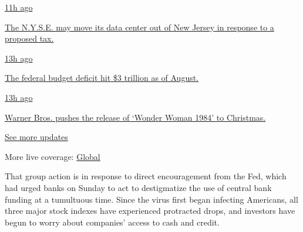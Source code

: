 \href{https://www.nytimes3xbfgragh.onion/live/2020/09/11/business/stock-market-today-coronavirus?action=click\&pgtype=Article\&state=default\&region=MAIN_CONTENT_1\&context=storylines_live_updates\#the-nyse-may-move-its-data-center-out-of-new-jersey-in-response-to-a-proposed-tax}{11h
ago}

\href{https://www.nytimes3xbfgragh.onion/live/2020/09/11/business/stock-market-today-coronavirus?action=click\&pgtype=Article\&state=default\&region=MAIN_CONTENT_1\&context=storylines_live_updates\#the-nyse-may-move-its-data-center-out-of-new-jersey-in-response-to-a-proposed-tax}{The
N.Y.S.E. may move its data center out of New Jersey in response to a
proposed tax.}

\href{https://www.nytimes3xbfgragh.onion/live/2020/09/11/business/stock-market-today-coronavirus?action=click\&pgtype=Article\&state=default\&region=MAIN_CONTENT_1\&context=storylines_live_updates\#the-federal-budget-deficit-hit-3-trillion-as-of-august}{13h
ago}

\href{https://www.nytimes3xbfgragh.onion/live/2020/09/11/business/stock-market-today-coronavirus?action=click\&pgtype=Article\&state=default\&region=MAIN_CONTENT_1\&context=storylines_live_updates\#the-federal-budget-deficit-hit-3-trillion-as-of-august}{The
federal budget deficit hit \$3 trillion as of August.}

\href{https://www.nytimes3xbfgragh.onion/live/2020/09/11/business/stock-market-today-coronavirus?action=click\&pgtype=Article\&state=default\&region=MAIN_CONTENT_1\&context=storylines_live_updates\#warner-bros-pushes-the-release-of-wonder-woman-1984-to-christmas}{13h
ago}

\href{https://www.nytimes3xbfgragh.onion/live/2020/09/11/business/stock-market-today-coronavirus?action=click\&pgtype=Article\&state=default\&region=MAIN_CONTENT_1\&context=storylines_live_updates\#warner-bros-pushes-the-release-of-wonder-woman-1984-to-christmas}{Warner
Bros. pushes the release of `Wonder Woman 1984' to Christmas.}

\href{https://www.nytimes3xbfgragh.onion/live/2020/09/11/business/stock-market-today-coronavirus?action=click\&pgtype=Article\&state=default\&region=MAIN_CONTENT_1\&context=storylines_live_updates}{See
more updates}

More live coverage:
\href{https://www.nytimes3xbfgragh.onion/2020/09/11/world/covid-19-coronavirus.html?action=click\&pgtype=Article\&state=default\&region=MAIN_CONTENT_1\&context=storylines_live_updates}{Global}

That group action is in response to direct encouragement from the Fed,
which had urged banks on Sunday to act to destigmatize the use of
central bank funding at a tumultuous time. Since the virus first began
infecting Americans, all three major stock indexes have experienced
protracted drops, and investors have begun to worry about companies'
access to cash and credit.

